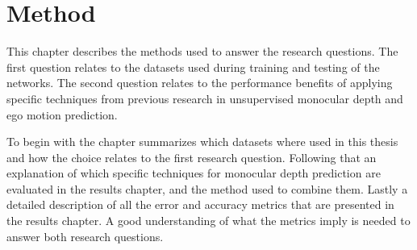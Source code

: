 \chapter{Method}\label{cha:method}

This chapter describes the methods used to answer the research questions. The first question relates to the datasets used during training and testing of the networks. The second question relates to the performance benefits of applying specific techniques from previous research in unsupervised monocular depth and ego motion prediction.

To begin with the chapter summarizes which datasets where used in this thesis and how the choice relates to the first research question. Following that an explanation of which specific techniques for monocular depth prediction are evaluated in the results chapter, and the method used to combine them. Lastly a detailed description of all the error and accuracy metrics that are presented in the results chapter. A good understanding of what the metrics imply is needed to answer both research questions.






